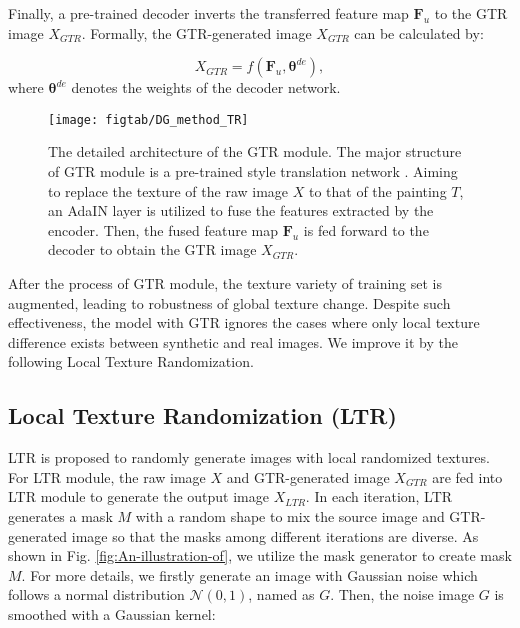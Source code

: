 \documentclass[twocolumn,journal,vlined,ruled,linesnumbered]{IEEEtran}
\begin{document}
Finally, a pre-trained decoder inverts the transferred feature map $\mathbf{F_{\mathit{u}}}$ to the GTR image $X_{GTR}$. Formally, the GTR-generated image $X_{GTR}$ can be calculated by:

\vspace{-2mm}

\begin{equation}
X_{GTR}=f(\mathbf{F_{\mathit{u}}},\boldsymbol{\theta}^{de}),
\end{equation}
where $\boldsymbol{\theta}^{de}$ denotes the weights of the decoder network.

\begin{figure}[t]
\begin{centering}
\texttt{[image: figtab/DG\_method\_TR]}
\par\end{centering}
\vspace{-2mm}
\caption{The detailed architecture of the GTR module. The major structure of GTR module is a pre-trained style translation network \cite{huang2017arbitrary}. Aiming to replace the texture of the raw image $X$ to that of the painting $T$, an AdaIN layer \cite{huang2017arbitrary} is utilized to fuse the features extracted by the encoder. Then, the fused feature map $\mathbf{F}_{u}$ is fed forward to the decoder to obtain the GTR image $X_{GTR}$.\label{fig:The-detailed-architecture}}
\vspace{-4mm}
\end{figure}

After the process of GTR module, the texture variety of training set is augmented, leading to robustness of global texture change. Despite such effectiveness, the model with GTR ignores the cases where only local texture difference exists between synthetic and real images. We improve it by the following Local Texture Randomization.

\subsection{Local Texture Randomization (LTR)}

LTR is proposed to randomly generate images with local randomized textures. For LTR module, the raw image $X$ and GTR-generated image $X_{GTR}$ are fed into LTR module to generate the output image $X_{LTR}$. In each iteration, LTR generates a mask $M$ with a random shape to mix the source image and GTR-generated image so that the masks among different iterations are diverse. As shown in Fig. \ref{fig:An-illustration-of}, we utilize the mask generator \cite{french2019semi} to create mask $M$. For more details, we firstly generate an image with Gaussian noise which follows a normal distribution $\mathcal{N}(0,1)$, named as $G$. Then, the noise image $G$ is smoothed with a Gaussian kernel:
\end{document}
